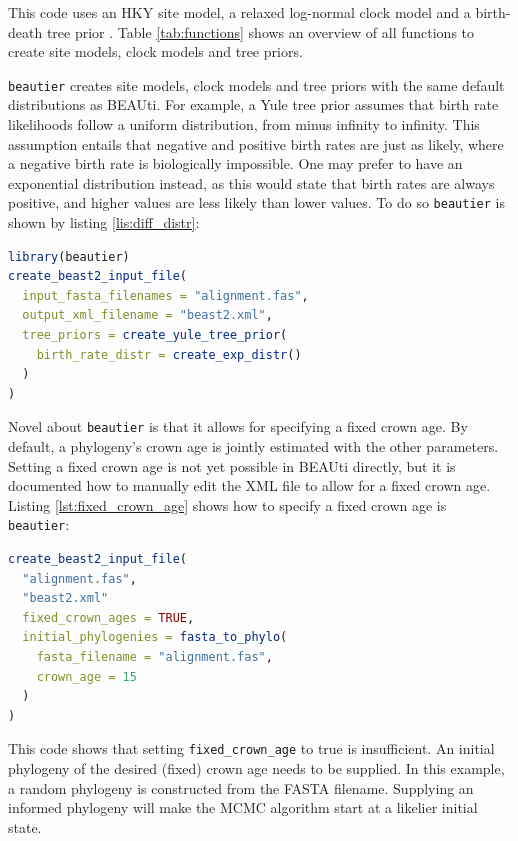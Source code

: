 \documentclass{article}
\begin{document}
This code uses an HKY site model, a relaxed log-normal clock model and a birth-death tree prior \cite{kendall1948generalized}.
Table \ref{tab:functions} shows an overview of all functions to create site models, clock models and tree priors.

\verb;beautier; creates site models, clock models and tree priors with the same default distributions as BEAUti.
For example, a Yule tree prior assumes that birth rate likelihoods follow a uniform distribution, from minus infinity
to infinity. This assumption entails that negative and positive birth rates are just as likely, where a negative birth rate is biologically impossible. 
One may prefer to have an exponential distribution instead, as this would state that birth rates are always positive, and
higher values are less likely than lower values. To do so \verb;beautier; is shown by listing \ref{lis:diff_distr}:


\begin{lstlisting}[language=R, caption=Example with Yule tree prior with different birth rate distribution, label=lst:diff_distr, floatplacement=H]
library(beautier)
create_beast2_input_file(
  input_fasta_filenames = "alignment.fas",
  output_xml_filename = "beast2.xml",
  tree_priors = create_yule_tree_prior(
    birth_rate_distr = create_exp_distr()    
  )
)
\end{lstlisting}

Novel about \verb;beautier; is that it allows for specifying a fixed crown age. 
By default, a phylogeny's crown age is jointly estimated with the other parameters.
Setting a fixed crown age is not yet possible in BEAUti directly, but it is documented how to 
manually edit the XML file to allow for a fixed crown age. Listing \ref{lst:fixed_crown_age} shows how to specify a fixed crown age is \verb;beautier;:

\begin{lstlisting}[language=R, caption=Example with fixed crown age, label=lst:fixed_crown_age, floatplacement=H]
create_beast2_input_file(
  "alignment.fas",
  "beast2.xml"
  fixed_crown_ages = TRUE,
  initial_phylogenies = fasta_to_phylo(
    fasta_filename = "alignment.fas", 
    crown_age = 15
  )
)
\end{lstlisting}

This code shows that setting \verb;fixed_crown_age; to true is insufficient. An
initial phylogeny of the desired (fixed) crown age needs to be supplied. In this
example, a random phylogeny is constructed from the FASTA filename. Supplying an 
informed phylogeny will make the MCMC algorithm start at a likelier initial state.
\end{document}
